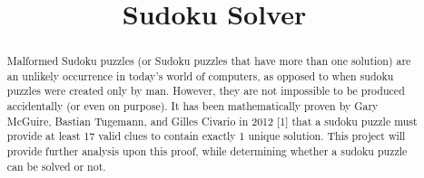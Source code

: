 \documentclass[conference]{IEEEtran}
\title{Sudoku Solver}
\begin{document}
\author{
\and
{}
\and
{}
\and
{}
\and
{}
}
\maketitle

\vspace{2\baselineskip}


\vspace{1\baselineskip}

\begin{abstract}
Malformed Sudoku puzzles (or Sudoku puzzles that have more than one solution) are an unlikely occurrence in today's world of computers, as opposed to when sudoku puzzles were created only by man. However, they are not impossible to be produced accidentally (or even on purpose). It has been mathematically proven by Gary McGuire, Bastian Tugemann, and Gilles Civario in 2012 [1] that a sudoku puzzle must provide at least 17 valid clues to contain exactly 1 unique solution. This project will provide further analysis upon this proof, while determining whether a sudoku puzzle can be solved or not.
\end{abstract}
\end{document}
